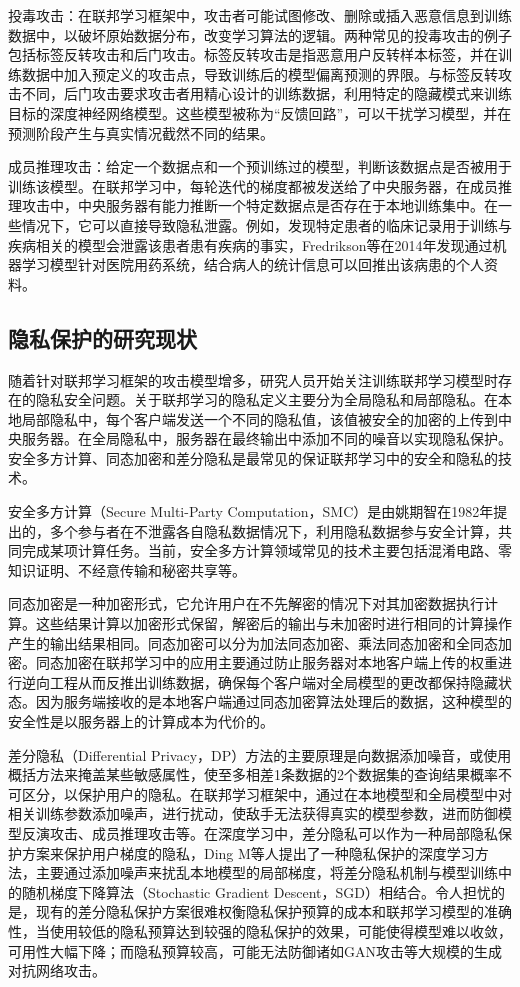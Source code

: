 投毒攻击：在联邦学习框架中，攻击者可能试图修改、删除或插入恶意信息到训练数据中，以破坏原始数据分布，改变学习算法的逻辑。两种常见的投毒攻击的例子包括标签反转攻击和后门攻击。标签反转攻击是指恶意用户反转样本标签，并在训练数据中加入预定义的攻击点，导致训练后的模型偏离预测的界限。与标签反转攻击不同，后门攻击要求攻击者用精心设计的训练数据，利用特定的隐藏模式来训练目标的深度神经网络模型。这些模型被称为“反馈回路”，可以干扰学习模型，并在预测阶段产生与真实情况截然不同的结果。

成员推理攻击：给定一个数据点和一个预训练过的模型，判断该数据点是否被用于训练该模型。在联邦学习中，每轮迭代的梯度都被发送给了中央服务器，在成员推理攻击中，中央服务器有能力推断一个特定数据点是否存在于本地训练集中。在一些情况下，它可以直接导致隐私泄露。例如，发现特定患者的临床记录用于训练与疾病相关的模型会泄露该患者患有疾病的事实，Fredrikson等在2014年发现通过机器学习模型针对医院用药系统，结合病人的统计信息可以回推出该病患的个人资料。

\subsection{隐私保护的研究现状}
随着针对联邦学习框架的攻击模型增多，研究人员开始关注训练联邦学习模型时存在的隐私安全问题。关于联邦学习的隐私定义主要分为全局隐私和局部隐私。在本地局部隐私中，每个客户端发送一个不同的隐私值，该值被安全的加密的上传到中央服务器。在全局隐私中，服务器在最终输出中添加不同的噪音以实现隐私保护。安全多方计算、同态加密和差分隐私是最常见的保证联邦学习中的安全和隐私的技术。

安全多方计算（Secure Multi-Party Computation，SMC）是由姚期智在1982年提出的，多个参与者在不泄露各自隐私数据情况下，利用隐私数据参与安全计算，共同完成某项计算任务。当前，安全多方计算领域常见的技术主要包括混淆电路、零知识证明、不经意传输和秘密共享等。

同态加密是一种加密形式，它允许用户在不先解密的情况下对其加密数据执行计算。这些结果计算以加密形式保留，解密后的输出与未加密时进行相同的计算操作产生的输出结果相同。同态加密可以分为加法同态加密、乘法同态加密和全同态加密。同态加密在联邦学习中的应用主要通过防止服务器对本地客户端上传的权重进行逆向工程从而反推出训练数据，确保每个客户端对全局模型的更改都保持隐藏状态。因为服务端接收的是本地客户端通过同态加密算法处理后的数据，这种模型的安全性是以服务器上的计算成本为代价的。

差分隐私（Differential Privacy，DP）方法的主要原理是向数据添加噪音，或使用概括方法来掩盖某些敏感属性，使至多相差1条数据的2个数据集的查询结果概率不可区分，以保护用户的隐私。在联邦学习框架中，通过在本地模型和全局模型中对相关训练参数添加噪声，进行扰动，使敌手无法获得真实的模型参数，进而防御模型反演攻击、成员推理攻击等。在深度学习中，差分隐私可以作为一种局部隐私保护方案来保护用户梯度的隐私，Ding M等人提出了一种隐私保护的深度学习方法，主要通过添加噪声来扰乱本地模型的局部梯度，将差分隐私机制与模型训练中的随机梯度下降算法（Stochastic Gradient Descent，SGD）相结合。令人担忧的是，现有的差分隐私保护方案很难权衡隐私保护预算的成本和联邦学习模型的准确性，当使用较低的隐私预算达到较强的隐私保护的效果，可能使得模型难以收敛，可用性大幅下降；而隐私预算较高，可能无法防御诸如GAN攻击等大规模的生成对抗网络攻击。

